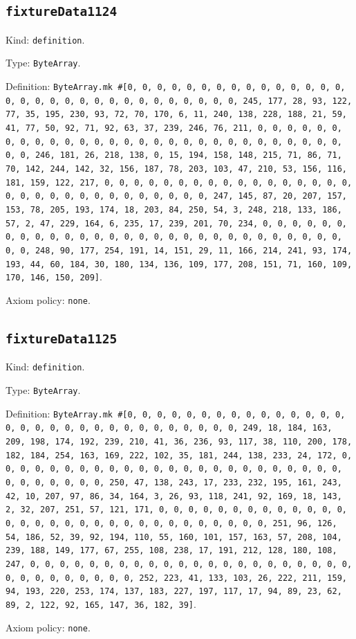 \documentclass[11pt]{article}
\begin{document}
\subsection*{\texttt{fixtureData1124}}
\noindent Kind: \texttt{definition}.\par
\noindent Type: \texttt{ByteArray}.\par
\noindent Definition: \texttt{ByteArray.mk \#[0, 0, 0, 0, 0, 0, 0, 0, 0, 0, 0, 0, 0, 0, 0, 0, 0, 0, 0, 0, 0, 0, 0, 0, 0, 0, 0, 0, 0, 0, 0, 245, 177, 28, 93, 122, 77, 35, 195, 230, 93, 72, 70, 170, 6, 11, 240, 138, 228, 188, 21, 59, 41, 77, 50, 92, 71, 92, 63, 37, 239, 246, 76, 211, 0, 0, 0, 0, 0, 0, 0, 0, 0, 0, 0, 0, 0, 0, 0, 0, 0, 0, 0, 0, 0, 0, 0, 0, 0, 0, 0, 0, 0, 0, 0, 246, 181, 26, 218, 138, 0, 15, 194, 158, 148, 215, 71, 86, 71, 70, 142, 244, 142, 32, 156, 187, 78, 203, 103, 47, 210, 53, 156, 116, 181, 159, 122, 217, 0, 0, 0, 0, 0, 0, 0, 0, 0, 0, 0, 0, 0, 0, 0, 0, 0, 0, 0, 0, 0, 0, 0, 0, 0, 0, 0, 0, 0, 0, 0, 247, 145, 87, 20, 207, 157, 153, 78, 205, 193, 174, 18, 203, 84, 250, 54, 3, 248, 218, 133, 186, 57, 2, 47, 229, 164, 6, 235, 17, 239, 201, 70, 234, 0, 0, 0, 0, 0, 0, 0, 0, 0, 0, 0, 0, 0, 0, 0, 0, 0, 0, 0, 0, 0, 0, 0, 0, 0, 0, 0, 0, 0, 0, 0, 248, 90, 177, 254, 191, 14, 151, 29, 11, 166, 214, 241, 93, 174, 193, 44, 60, 184, 30, 180, 134, 136, 109, 177, 208, 151, 71, 160, 109, 170, 146, 150, 209]}.\par
\noindent Axiom policy: \texttt{none}.\par
\subsection*{\texttt{fixtureData1125}}
\noindent Kind: \texttt{definition}.\par
\noindent Type: \texttt{ByteArray}.\par
\noindent Definition: \texttt{ByteArray.mk \#[0, 0, 0, 0, 0, 0, 0, 0, 0, 0, 0, 0, 0, 0, 0, 0, 0, 0, 0, 0, 0, 0, 0, 0, 0, 0, 0, 0, 0, 0, 0, 249, 18, 184, 163, 209, 198, 174, 192, 239, 210, 41, 36, 236, 93, 117, 38, 110, 200, 178, 182, 184, 254, 163, 169, 222, 102, 35, 181, 244, 138, 233, 24, 172, 0, 0, 0, 0, 0, 0, 0, 0, 0, 0, 0, 0, 0, 0, 0, 0, 0, 0, 0, 0, 0, 0, 0, 0, 0, 0, 0, 0, 0, 0, 0, 250, 47, 138, 243, 17, 233, 232, 195, 161, 243, 42, 10, 207, 97, 86, 34, 164, 3, 26, 93, 118, 241, 92, 169, 18, 143, 2, 32, 207, 251, 57, 121, 171, 0, 0, 0, 0, 0, 0, 0, 0, 0, 0, 0, 0, 0, 0, 0, 0, 0, 0, 0, 0, 0, 0, 0, 0, 0, 0, 0, 0, 0, 0, 0, 251, 96, 126, 54, 186, 52, 39, 92, 194, 110, 55, 160, 101, 157, 163, 57, 208, 104, 239, 188, 149, 177, 67, 255, 108, 238, 17, 191, 212, 128, 180, 108, 247, 0, 0, 0, 0, 0, 0, 0, 0, 0, 0, 0, 0, 0, 0, 0, 0, 0, 0, 0, 0, 0, 0, 0, 0, 0, 0, 0, 0, 0, 0, 0, 252, 223, 41, 133, 103, 26, 222, 211, 159, 94, 193, 220, 253, 174, 137, 183, 227, 197, 117, 17, 94, 89, 23, 62, 89, 2, 122, 92, 165, 147, 36, 182, 39]}.\par
\noindent Axiom policy: \texttt{none}.\par
\end{document}
